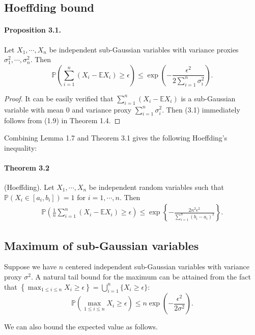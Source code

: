 \documentclass{article}
\newcommand{\E}{\mathbb{E}}
\begin{document}
\subsection{Hoeffding bound}
\paragraph{Proposition 3.1.} Let $X_1,\cdots,X_n$ be independent sub-Gaussian variables with variance proxies $\sigma_1^2,\cdots,\sigma_n^2$. Then
\begin{equation*}
	\mathbb{P}\left(\sum_{i=1}^n (X_i-\E X_i)\geq \epsilon\right) \leq \exp\left(-\frac{\epsilon^2}{2\sum_{i=1}^n\sigma_i^2}\right).\tag{3.1}
\end{equation*}
\begin{proof}
	It can be easily verified that $\sum_{i=1}^n(X_i-\E X_i)$ is a sub-Gaussian variable with mean $0$ and variance proxy $\sum_{i=1}^n\sigma_i^2.$ Then (3.1) immediately follows from (1.9) in Theorem 1.4.
\end{proof}

Combining Lemma 1.7 and Theorem 3.1 gives the following Hoeffding's inequality:
\paragraph{Theorem 3.2} (Hoeffding). Let $X_1,\cdots,X_n$ be independent random variables such that $\mathbb{P}(X_i\in[a_i,b_i])=1$ for $i=1,\cdots,n$. Then
\begin{align*}
	\mathbb{P}\left(\frac{1}{n}\sum_{i=1}^n(X_i - \E X_i)\geq\epsilon\right)\leq \exp\left\{-\frac{2n^2\epsilon^2}{\sum_{i=1}^n(b_i-a_i)^2}\right\}.\tag{3.2}
\end{align*}

\subsection{Maximum of sub-Gaussian variables}
Suppose we have $n$ centered independent sub-Gaussian variables with variance proxy $\sigma^2.$ A natural tail bound for the maximum can be attained from the fact that $\left\{\max_{1\leq i\leq n}X_i\geq \epsilon\right\} = \bigcup_{i=1}^n\{X_i\geq\epsilon\}$:
\begin{equation*}
	\mathbb{P}\left(\max_{1\leq i\leq n} X_i \geq \epsilon\right) \leq n\exp\left(-\frac{\epsilon^2}{2\sigma^2}\right).\tag{3.3}
\end{equation*}

We can also bound the expected value as follows.
\end{document}
